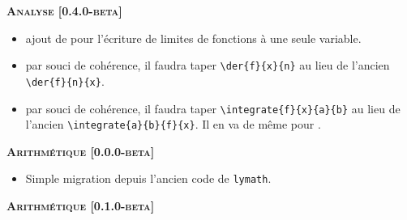 \documentclass[12pt,a4paper]{book}
\begin{document}
\begin{description}
\begin{itemize}[itemsep=.5em]
    
    
        
    \end{itemize}
    
    
    \begin{center}
        \textbf{\textsc{Analyse [0.4.0-beta]}}
    \end{center}
    
    \begin{itemize}[itemsep=.5em]
        \item {}
              ajout de  pour l'écriture de limites de fonctions à une seule variable.
    
    
        
    
        \item {}
              par souci de cohérence, il faudra taper \verb#\der{f}{x}{n}# au lieu de l'ancien \verb#\der{f}{n}{x}#.
    
    
        
    
        \item {}
              par souci de cohérence, il faudra taper \verb#\integrate{f}{x}{a}{b}# au lieu de l'ancien \verb#\integrate{a}{b}{f}{x}#.
              Il en va de même pour .
    
    
        
    \end{itemize}
    
    
    \separation
    
    
    
    
    \begin{center}
        \textbf{\textsc{Arithmétique [0.0.0-beta]}}
    \end{center}
    
    \begin{itemize}[itemsep=.5em]
        \item Simple migration depuis l'ancien code de \verb+lymath+.
    \end{itemize}
    
    
    \begin{center}
        \textbf{\textsc{Arithmétique [0.1.0-beta]}}
    \end{center}
    

\end{description}
\end{document}

